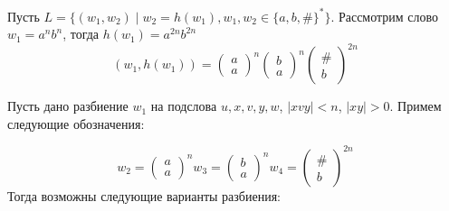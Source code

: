 \documentclass[a4paper, 14pt]{article}
\begin{document}
Пусть $L = \{(w_1, w_2) \mid w_2 = h(w_1), w_1, w_2 \in \{a, b, \# \}^{*}\}$. Рассмотрим слово $w_1 = a^{n}b^{n}$, тогда $h(w_1) = a^{2n}b^{2n}$
$$
(w_1, h(w_1)) = 
\begin{pmatrix}
	a\\
	a
\end{pmatrix}^n
\begin{pmatrix}
	b\\
	a
\end{pmatrix}^n
\begin{pmatrix}
	\# \\
	b	
\end{pmatrix}^{2n}
$$


Пусть дано разбиение $w_1$ на подслова $u, x, v, y, w$, $| xvy | < n$, $| xy | > 0$.
Примем следующие обозначения:

\[
	w_2 = 
	\begin{pmatrix}
	a\\
	a
	\end{pmatrix}^n
	w_3 = 
	\begin{pmatrix}
	b\\
	a
	\end{pmatrix}^n
	w_4 = 
	\begin{pmatrix}
	\# \\
	b	
	\end{pmatrix}^{2n}
\]
Тогда возможны следующие варианты разбиения:
\end{document}
